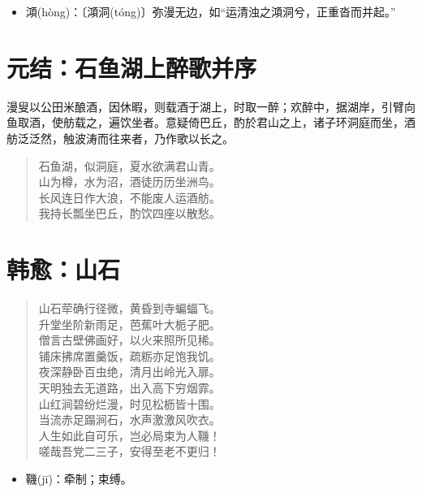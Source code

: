 \documentclass[12pt,oneside]{book}
\newenvironment{shici}{
\begin{verse}
\centering\large\hspace{12pt}}
{\end{verse}}
\begin{document}
\begin{itemize}
\item 澒(hòng)：〔澒洞(tóng)〕弥漫无边，如“运清浊之澒洞兮，正重沓而并起。”
\end{itemize}

\chapter{元结：石鱼湖上醉歌并序}
漫叟以公田米酿酒，因休暇，则载酒于湖上，时取一醉；欢醉中，据湖岸，引臂向鱼取酒，使舫载之，遍饮坐者。意疑倚巴丘，酌於君山之上，诸子环洞庭而坐，酒舫泛泛然，触波涛而往来者，乃作歌以长之。

\begin{shici}
石鱼湖，似洞庭，夏水欲满君山青。\\
山为樽，水为沼，酒徒历历坐洲鸟。\\
长风连日作大浪，不能废人运酒舫。\\
我持长瓢坐巴丘，酌饮四座以散愁。
\end{shici}

\chapter{韩愈：山石}
\begin{shici}
山石荦确行径微，黄昏到寺蝙蝠飞。\\
升堂坐阶新雨足，芭蕉叶大栀子肥。\\
僧言古壁佛画好，以火来照所见稀。\\
铺床拂席置羹饭，疏粝亦足饱我饥。\\
夜深静卧百虫绝，清月出岭光入扉。\\
天明独去无道路，出入高下穷烟霏。\\
山红涧碧纷烂漫，时见松枥皆十围。\\
当流赤足蹋涧石，水声激激风吹衣。\\
人生如此自可乐，岂必局束为人鞿！\\
嗟哉吾党二三子，安得至老不更归！
\end{shici}

\begin{itemize}
\item 鞿(jī)：牵制；束缚。
\end{itemize}
\end{document}
